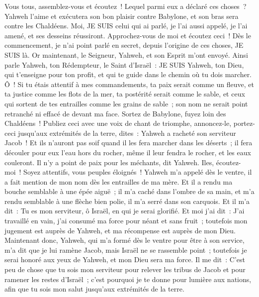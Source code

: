 \begin{multicols}{2}
Vous tous, assemblez-vous et écoutez~! Lequel parmi eux a déclaré ces choses~? Yahweh l'aime et exécutera son bon plaisir contre Babylone, et son bras sera contre les Chaldéens.
Moi, JE SUIS celui qui ai parlé, je l'ai aussi appelé, je l'ai amené, et ses desseins réussiront.
Approchez-vous de moi et écoutez ceci~! Dès le commencement, je n'ai point parlé en secret, depuis l'origine de ces choses, JE SUIS là. Or maintenant, le Seigneur, Yahweh, et son Esprit m'ont envoyé.
Ainsi parle Yahweh, ton Rédempteur, le Saint d'Israël~: JE SUIS Yahweh, ton Dieu, qui t'enseigne pour ton profit, et qui te guide dans le chemin où tu dois marcher.
Ô~! Si tu étais attentif à mes commandements, ta paix serait comme un fleuve, et ta justice comme les flots de la mer,
ta postérité serait comme le sable, et ceux qui sortent de tes entrailles comme les grains de sable~; son nom ne serait point retranché ni effacé de devant ma face.
Sortez de Babylone, fuyez loin des Chaldéens~! Publiez ceci avec une voix de chant de triomphe, annoncez-le, portez-ceci jusqu'aux extrémités de la terre, dites~: Yahweh a racheté son serviteur Jacob~!
Et ils n'auront pas soif quand il les fera marcher dans les déserts~; il fera découler pour eux l'eau hors du rocher, même il leur fendra le rocher, et les eaux couleront.
Il n'y a point de paix pour les méchants, dit Yahweh.
\VerseOne{}Iles, écoutez-moi~! Soyez attentifs, vous peuples éloignés~! Yahweh m'a appelé dès le ventre, il a fait mention de mon nom dès les entrailles de ma mère.
Et il a rendu ma bouche semblable à une épée aiguë~; il m'a caché dans l'ombre de sa main, et m'a rendu semblable à une flèche bien polie, il m'a serré dans son carquois.
Et il m'a dit~: Tu es mon serviteur, ô Israël, en qui je serai glorifié.
Et moi j'ai dit~: J'ai travaillé en vain, j'ai consumé ma force pour néant et sans fruit~; toutefois mon jugement est auprès de Yahweh, et ma récompense est auprès de mon Dieu.
Maintenant donc, Yahweh, qui m'a formé dès le ventre pour être à son service, m'a dit que je lui ramène Jacob, mais Israël ne se rassemble point~; toutefois je serai honoré aux yeux de Yahweh, et mon Dieu sera ma force.
Il me dit~: C'est peu de chose que tu sois mon serviteur pour relever les tribus de Jacob et pour ramener les restes d'Israël~; c'est pourquoi je te donne pour lumière aux nations, afin que tu sois mon salut jusqu'aux extrémités de la terre.

\end{multicols}
